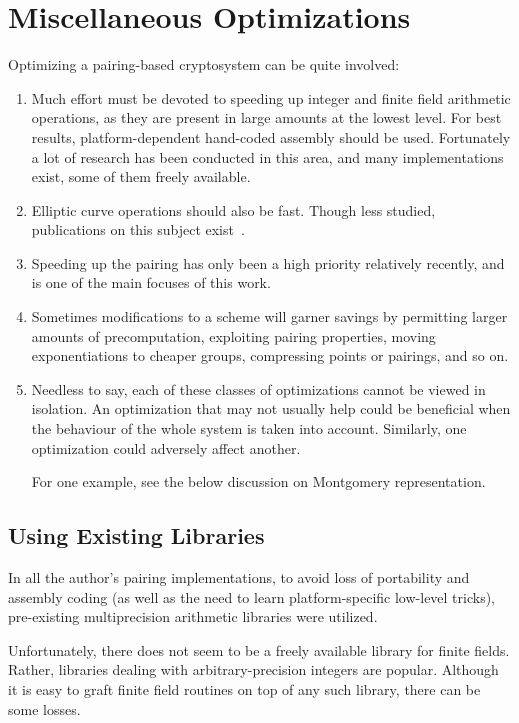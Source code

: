 \chapter{Miscellaneous Optimizations}

Optimizing a pairing-based cryptosystem can be quite involved:

\begin{enumerate}
\item
Much effort must be devoted to speeding up
integer and finite field arithmetic operations, as they are present
in large amounts at the lowest level. For best results, platform-dependent
hand-coded assembly should be used.
Fortunately a lot of research has been conducted in this area,
and many implementations exist, some of them freely available.
\item
Elliptic curve operations should also be fast. Though less studied,
publications on this subject exist~\cite{bss}.
\item
Speeding up the pairing has only been a high priority relatively recently,
and is one of the main focuses of this work.
\item
Sometimes modifications to a scheme will garner savings by
permitting larger amounts of precomputation, exploiting pairing
properties, moving exponentiations to cheaper groups, compressing points or
pairings, and so on.
\item
Needless to say, each of these classes of optimizations cannot be viewed
in isolation. An optimization that may not usually help could be beneficial
when the behaviour of the whole system is taken into account.
Similarly, one optimization could adversely affect another.

For one example, see the below
discussion on Montgomery representation.
\end{enumerate}

\section{Using Existing Libraries}

In all the author's pairing implementations, to avoid loss of portability
and assembly coding (as well as the need to learn platform-specific
low-level tricks), pre-existing multiprecision arithmetic libraries
were utilized.

Unfortunately, there does not seem to be a freely available library for
finite fields. Rather, libraries dealing with arbitrary-precision integers
are popular. Although it is easy to graft finite field routines on top
of any such library, there can be some losses.

